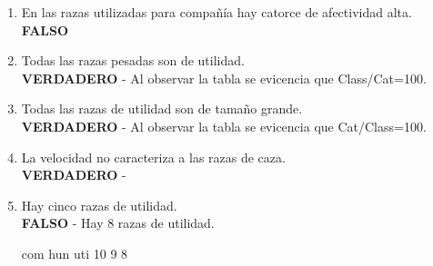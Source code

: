\documentclass[letterpaper, 12pt]{article}
\begin{document}
\begin{enumerate}
\begin{Schunk}
\end{Schunk}
\item En las razas utilizadas para compañía hay catorce de afectividad alta.\\
\textbf{FALSO}
\item Todas las razas pesadas son de utilidad.\\
\textbf{VERDADERO} - Al observar la tabla se evicencia que Class/Cat=100.
\item Todas las razas de utilidad son de tamaño grande.\\
\textbf{VERDADERO} - Al observar la tabla se evicencia que Cat/Class=100.
\item La velocidad no caracteriza a las razas de caza.\\
\textbf{VERDADERO} - 
\item Hay cinco razas de utilidad.\\
\textbf{FALSO} - Hay 8 razas de utilidad.
\begin{Schunk}
\begin{Soutput}
com hun uti 
 10   9   8 
\end{Soutput}
\end{Schunk}
\end{enumerate}
\end{document}
